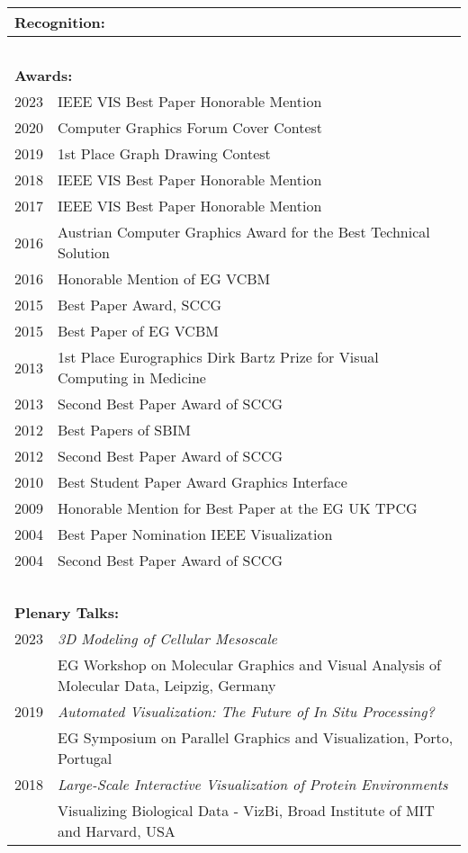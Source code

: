\documentclass[a4paper,11pt]{letter}
\begin{document}
\newpage
\normalsize
\begin{tabular}{l| l}
\multicolumn{2}{l}{\large{\textbf{Recognition:}}} \\
\hline
\multicolumn{2}{l}{\textbf{~}} \\
\multicolumn{2}{l}{\textbf{Awards:}} \\
2023 & IEEE VIS Best Paper Honorable Mention\\
2020 & Computer Graphics Forum Cover Contest\\
2019 & 1st Place Graph Drawing Contest\\
2018 & IEEE VIS Best Paper Honorable Mention\\
2017 & IEEE VIS Best Paper Honorable Mention\\
2016 & Austrian Computer Graphics Award for the Best Technical Solution\\
2016 & Honorable Mention of EG VCBM\\
2015 & Best Paper Award, SCCG\\
2015 & Best Paper of EG VCBM\\
2013 & 1st Place Eurographics Dirk Bartz Prize for Visual Computing in Medicine\\
2013 & Second Best Paper Award of SCCG\\
2012 & Best Papers of SBIM\\
2012 & Second Best Paper Award of SCCG\\
2010 & Best Student Paper Award Graphics Interface\\
2009 & Honorable Mention for Best Paper at the EG UK TPCG\\
2004 & Best Paper Nomination IEEE Visualization\\
2004 & Second Best Paper Award of SCCG \\
\hline
\multicolumn{2}{l}{\textbf{~}} \\
\multicolumn{2}{l}{\textbf{Plenary Talks:}} \\
2023 & \emph{3D Modeling of Cellular Mesoscale} \\
 & EG Workshop on Molecular Graphics and Visual Analysis of Molecular Data, Leipzig, Germany \\
2019 & \emph{Automated Visualization: The Future of In Situ Processing?} \\
 & EG Symposium on Parallel Graphics and Visualization, Porto, Portugal \\
2018 & \emph{Large-Scale Interactive Visualization of Protein Environments} \\
 & Visualizing Biological Data - VizBi, Broad Institute of MIT and Harvard, USA \\

\end{tabular}
\end{document}

